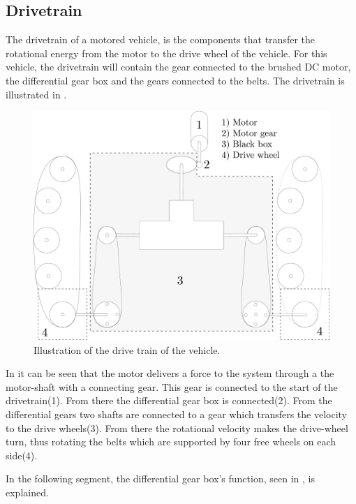 \subsection{Drivetrain}
The drivetrain of a motored vehicle, is the components that transfer the rotational energy from the motor to the drive wheel of the vehicle. For this vehicle, the drivetrain will contain the gear connected to the brushed DC motor, the differential gear box and the gears connected to the belts. The drivetrain is illustrated in .

\begin{figure}[H]
	\centering
	\includegraphics[scale=.25]{figures/vehicleDescriptionDriveTrain.pdf}
	\caption{Illustration of the drive train of the vehicle.}
	\label{vehicleDescriptionDriveTrain}
\end{figure}

In  it can be seen that the motor delivers a force to the system through a the motor-shaft with a connecting gear. This gear is connected to the start of the drivetrain(1). From there the differential gear box is connected(2). From the differential gears two shafts are connected to a gear which transfers the velocity to the drive wheels(3).
From there the rotational velocity makes the drive-wheel turn, thus rotating the belts which are supported by four free wheels on each side(4). 

In the following segment, the differential gear box's function, seen in , is explained.